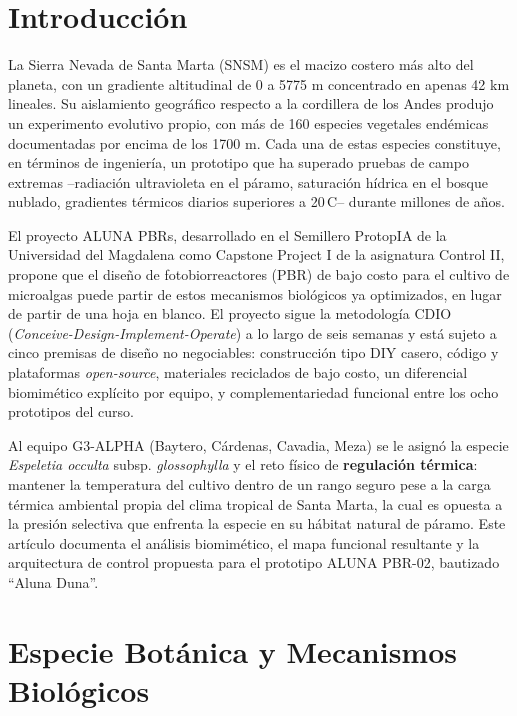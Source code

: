 \documentclass[conference]{IEEEtran}
\begin{document}
\section{Introducci\'on}
La Sierra Nevada de Santa Marta (SNSM) es el macizo costero m\'as alto del
planeta, con un gradiente altitudinal de 0 a 5775 m concentrado en apenas
42 km lineales. Su aislamiento geogr\'afico respecto a la cordillera de los
Andes produjo un experimento evolutivo propio, con m\'as de 160 especies
vegetales end\'emicas documentadas por encima de los 1700 m. Cada una de
estas especies constituye, en t\'erminos de ingenier\'ia, un prototipo que
ha superado pruebas de campo extremas --radiaci\'on ultravioleta en el
p\'aramo, saturaci\'on h\'idrica en el bosque nublado, gradientes t\'ermicos
diarios superiores a 20\,\textdegree C-- durante millones de a\~nos.

El proyecto ALUNA PBRs, desarrollado en el Semillero ProtopIA de la
Universidad del Magdalena como Capstone Project I de la asignatura Control
II, propone que el dise\~no de fotobiorreactores (PBR) de bajo costo para
el cultivo de microalgas puede partir de estos mecanismos biol\'ogicos ya
optimizados, en lugar de partir de una hoja en blanco. El proyecto sigue
la metodolog\'ia CDIO (\textit{Conceive-Design-Implement-Operate}) a lo
largo de seis semanas y est\'a sujeto a cinco premisas de dise\~no no
negociables: construcci\'on tipo DIY casero, c\'odigo y plataformas
\textit{open-source}, materiales reciclados de bajo costo, un diferencial
biomim\'etico expl\'icito por equipo, y complementariedad funcional entre
los ocho prototipos del curso.

Al equipo G3-ALPHA (Baytero, C\'ardenas, Cavadia, Meza) se le asign\'o la
especie \textit{Espeletia occulta} subsp. \textit{glossophylla} y el reto
f\'isico de \textbf{regulaci\'on t\'ermica}: mantener la temperatura del
cultivo dentro de un rango seguro pese a la carga t\'ermica ambiental
propia del clima tropical de Santa Marta, la cual es opuesta a la presi\'on
selectiva que enfrenta la especie en su h\'abitat natural de p\'aramo. Este
art\'iculo documenta el an\'alisis biomim\'etico, el mapa funcional
resultante y la arquitectura de control propuesta para el prototipo ALUNA
PBR-02, bautizado ``Aluna Duna''.

\section{Especie Bot\'anica y Mecanismos Biol\'ogicos}
\end{document}
